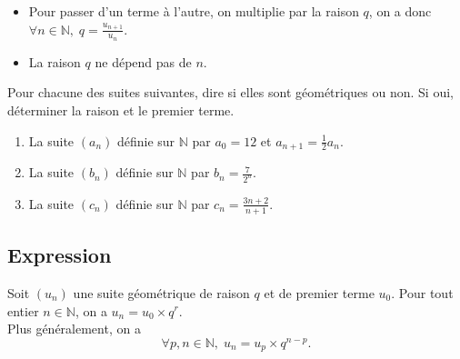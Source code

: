 \documentclass[11pt]{article}
\begin{document}
\begin{rmq}
  \begin{itemize}
    \item Pour passer d'un terme à l'autre, on multiplie par la raison $q$, on a donc
      $\forall n\in\mathbb{N},\;q=\frac{u_{n+1}}{u_n}$.
    \item La raison $q$ ne dépend pas de $n$.
  \end{itemize}
\end{rmq}

\begin{app}
  Pour chacune des suites suivantes, dire si elles sont géométriques ou non. Si
  oui, déterminer la raison et le premier terme.
  \begin{enumerate}
    \item La suite $\left( a_n \right)$ définie sur $\mathbb{N}$ par $a_0=12$ et
      $a_{n+1} = \frac{1}{2}a_n$.
    \item La suite $\left( b_n \right)$ définie sur $\mathbb{N}$ par $b_n =
      \frac{7}{2^n}$.
    \item La suite $\left( c_n \right)$ définie sur $\mathbb{N}$ par $c_n =
      \frac{3n+2}{n+1}$.
  \end{enumerate}
\end{app}

\subsection{Expression}
\begin{prop}
  Soit $(u_n)$ une suite géométrique de raison $q$ et de premier terme $u_0$.
  Pour tout entier $n\in\mathbb{N}$, on a $u_n = u_0 \times q^r$.\\
  Plus généralement, on a
  \[
    \forall p,n\in\mathbb{N},\; u_n = u_p \times q^{n-p}.
  \]
  
  \begin{center}
  \end{center}
\end{prop}
\end{document}

